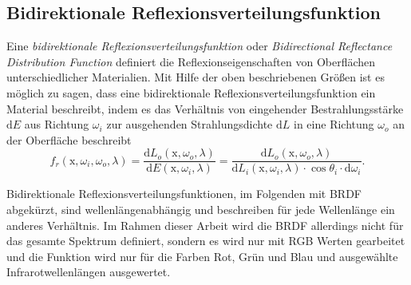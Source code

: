 \documentclass[thesis.tex]{subfiles}
\begin{document}
\subsection{Bidirektionale Reflexionsverteilungsfunktion}

Eine \emph{bidirektionale Reflexionsverteilungsfunktion} oder \emph{Bidirectional Reflectance Distribution Function} definiert die Reflexionseigenschaften von Oberflächen unterschiedlicher Materialien. Mit Hilfe der oben beschriebenen Größen ist es möglich zu sagen, dass eine bidirektionale Reflexionsverteilungsfunktion ein Material beschreibt, indem es das Verhältnis von eingehender Bestrahlungsstärke $\mathrm{d}E$ aus Richtung $\omega_i$ zur ausgehenden Strahlungsdichte $\mathrm{d}L$ in eine Richtung $\omega_o$ an der Oberfläche beschreibt
\begin{equation}
f_r(\mathrm{x}, \omega_i, \omega_o, \lambda) = \frac{\mathrm{d}L_o(\mathrm{x}, \omega_o, \lambda)}{\mathrm{d}E(\mathrm{x}, \omega_i, \lambda)}
= \frac{\mathrm{d}L_o(\mathrm{x}, \omega_o, \lambda)}{\mathrm{d}L_i(\mathrm{x}, \omega_i, \lambda) \cdot \cos\theta_i \cdot \mathrm{d}\omega_i}.
\end{equation}

Bidirektionale Reflexionsverteilungsfunktionen, im Folgenden mit BRDF abgekürzt, sind wellenlängenabhängig und beschreiben für jede Wellenlänge ein anderes Verhältnis. Im Rahmen dieser Arbeit wird die BRDF allerdings nicht für das gesamte Spektrum definiert, sondern es wird nur mit RGB Werten gearbeitet und die Funktion wird nur für die Farben Rot, Grün und Blau und ausgewählte Infrarotwellenlängen ausgewertet.
\end{document}
